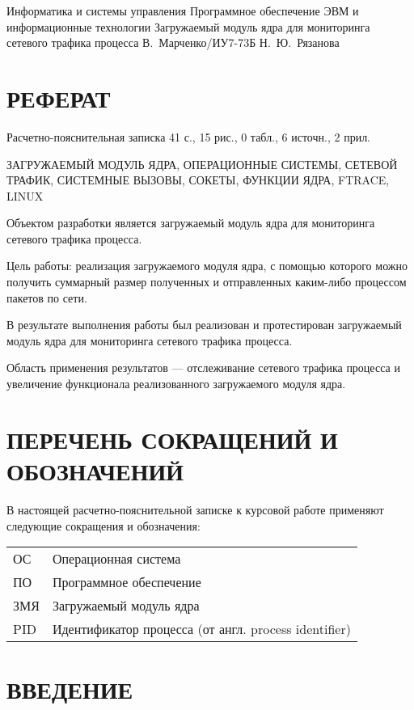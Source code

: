 \documentclass{bmstu}
\begin{document}
\makecourseworktitle
    {Информатика и системы управления}
    {Программное обеспечение ЭВМ и информационные технологии}
    {Загружаемый модуль ядра для мониторинга сетевого трафика процесса}
    {В.~Марченко/ИУ7-73Б}
    {Н.~Ю.~Рязанова}
    {}

\setcounter{page}{3}

{\centering \chapter*{РЕФЕРАТ}}

Расчетно-пояснительная записка 41 с., 15 рис., 0 табл., 6 источн., 2 прил.

\noindent ЗАГРУЖАЕМЫЙ МОДУЛЬ ЯДРА, ОПЕРАЦИОННЫЕ СИСТЕМЫ, СЕТЕВОЙ ТРАФИК, СИСТЕМНЫЕ ВЫЗОВЫ, СОКЕТЫ, ФУНКЦИИ ЯДРА, FTRACE, LINUX

Объектом разработки является загружаемый модуль ядра для мониторинга сетевого трафика процесса.

Цель работы: реализация загружаемого модуля ядра, с помощью которого можно получить суммарный размер полученных и отправленных каким-либо процессом пакетов по сети.

В результате выполнения работы был реализован и протестирован загружаемый модуль ядра для мониторинга сетевого трафика процесса.

Область применения результатов --- отслеживание сетевого трафика процесса и увеличение функционала реализованного загружаемого модуля ядра.

{\centering \maketableofcontents}

{\centering \chapter*{ПЕРЕЧЕНЬ СОКРАЩЕНИЙ И ОБОЗНАЧЕНИЙ}}

В настоящей расчетно-пояснительной записке к курсовой работе применяют следующие сокращения и обозначения:

\begin{table}[H]
\begin{tabular}{p{5cm}p{10.5cm}}
ОС & Операционная система
\tabularnewline
ПО & Программное обеспечение
\tabularnewline
ЗМЯ & Загружаемый модуль ядра
\tabularnewline
PID & Идентификатор процесса (от англ. process identifier)
\tabularnewline
\end{tabular}
\end{table}

{\centering \chapter*{ВВЕДЕНИЕ}}
\end{document}
